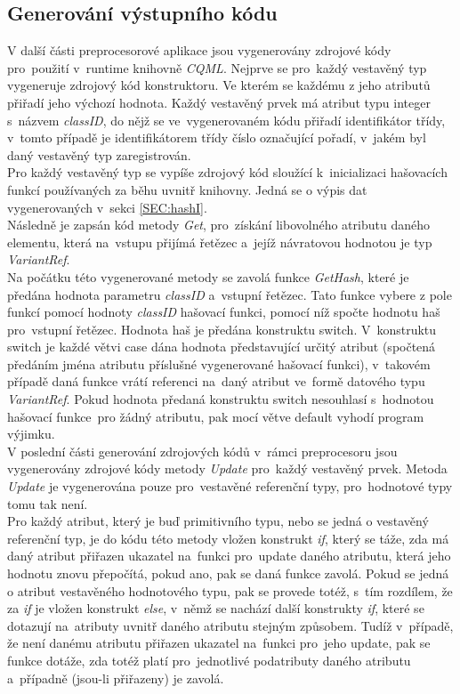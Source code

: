 \documentclass[11pt,twoside,a4paper]{book}
\begin{document}
\subsection{\label{SEC:prepGen}Generování výstupního kódu}
V další části preprocesorové aplikace jsou vygenerovány zdrojové kódy pro~použití v~runtime knihovně \textit{CQML}.
Nejprve se pro~každý vestavěný typ vygeneruje zdrojový kód konstruktoru. Ve kterém se každému z jeho atributů přiřadí jeho výchozí hodnota. Každý vestavěný prvek má atribut typu integer s~názvem \textit{classID}, do nějž se ve~vygenerovaném kódu přiřadí identifikátor třídy, v~tomto případě je identifikátorem třídy číslo označující pořadí, v~jakém byl daný vestavěný typ zaregistrován.\\
Pro každý vestavěný typ se vypíše zdrojový kód sloužící k~inicializaci hašovacích funkcí používaných za běhu uvnitř knihovny. Jedná se o výpis dat vygenerovaných v~sekci \ref{SEC:hashI}.\\
Následně je zapsán kód metody \textit{Get}, pro~získání libovolného atributu daného elementu, která na~vstupu přijímá řetězec a~jejíž návratovou hodnotou je typ \textit{VariantRef}.\\
Na počátku této vygenerované metody se zavolá funkce \textit{GetHash}, které je předána hodnota parametru \textit{classID} a~vstupní řetězec. Tato funkce vybere z pole funkcí pomocí hodnoty \textit{classID} hašovací funkci, pomocí níž spočte hodnotu haš pro~vstupní řetězec. Hodnota haš je předána konstruktu switch. V~konstruktu switch je každé větvi case dána hodnota představující určitý atribut (spočtená předáním jména atributu příslušné vygenerované hašovací funkci), v~takovém případě daná funkce vrátí referenci na~daný atribut ve~formě datového typu \textit{VariantRef}. Pokud hodnota předaná konstruktu switch nesouhlasí s~hodnotou hašovací funkce~pro žádný atributu, pak mocí větve default vyhodí program výjimku.\\
V poslední části generování zdrojových kódů v~rámci preprocesoru jsou vygenerovány zdrojové kódy metody \textit{Update} pro~každý vestavěný prvek. Metoda \textit{Update} je vygenerována pouze pro~vestavěné referenční typy, pro~hodnotové typy tomu tak není. \\
Pro každý atribut, který je buď primitivního typu, nebo se jedná o vestavěný referenční typ, je do kódu této metody vložen konstrukt \textit{if}, který se táže, zda má daný atribut přiřazen ukazatel na~funkci pro~update daného atributu, která jeho hodnotu znovu přepočítá, pokud ano, pak se daná funkce zavolá.
Pokud se jedná o atribut vestavěného hodnotového typu, pak se provede totéž, s~tím rozdílem, že za \textit{if} je vložen konstrukt \textit{else}, v~němž se nachází další konstrukty \textit{if}, které se dotazují na~atributy uvnitř daného atributu stejným způsobem. Tudíž v~případě, že není danému atributu přiřazen ukazatel na~funkci pro~jeho update, pak se funkce dotáže, zda totéž platí pro~jednotlivé podatributy daného atributu a~případně (jsou-li přiřazeny) je zavolá.\\
\end{document}
